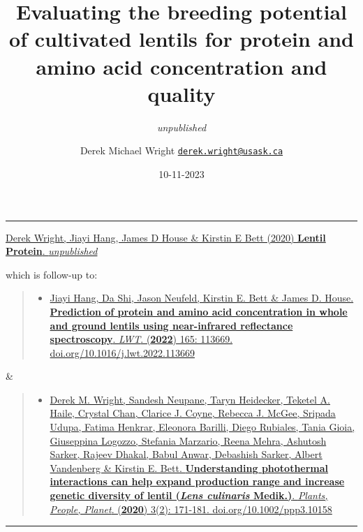 \documentclass[
]{article}
\title{Evaluating the breeding potential of cultivated lentils for
protein and amino acid concentration and quality}
\subtitle{\emph{unpublished}}
\author{Derek Michael Wright
\href{mailto:derek.wright@usask.ca}{\nolinkurl{derek.wright@usask.ca}}}
\date{10-11-2023}
\providecommand{\tightlist}{%
  \setlength{\itemsep}{0pt}\setlength{\parskip}{0pt}}
\begin{document}
\maketitle

{
\setcounter{tocdepth}{2}
\tableofcontents
}
\pagebreak

\begin{center}\rule{0.5\linewidth}{0.5pt}\end{center}

\href{https://github.com/derekmichaelwright/AGILE_LDP_Protein}{Derek
Wright, Jiayi Hang, James D House \& Kirstin E Bett (2020)
\textbf{Lentil Protein}. \emph{unpublished}}

which is follow-up to:

\begin{quote}
\begin{itemize}
\tightlist
\item
  \href{https://doi.org/10.1016/j.lwt.2022.113669}{Jiayi Hang, Da Shi,
  Jason Neufeld, Kirstin E. Bett \& James D. House. \textbf{Prediction
  of protein and amino acid concentration in whole and ground lentils
  using near-infrared reflectance spectroscopy}. \emph{LWT}.
  (\textbf{2022}) 165: 113669. doi.org/10.1016/j.lwt.2022.113669}
\end{itemize}
\end{quote}

\&

\begin{quote}
\begin{itemize}
\tightlist
\item
  \href{https://doi.org/10.1002/ppp3.10158}{Derek M. Wright, Sandesh
  Neupane, Taryn Heidecker, Teketel A. Haile, Crystal Chan, Clarice J.
  Coyne, Rebecca J. McGee, Sripada Udupa, Fatima Henkrar, Eleonora
  Barilli, Diego Rubiales, Tania Gioia, Giuseppina Logozzo, Stefania
  Marzario, Reena Mehra, Ashutosh Sarker, Rajeev Dhakal, Babul Anwar,
  Debashish Sarker, Albert Vandenberg \& Kirstin E. Bett.
  \textbf{Understanding photothermal interactions can help expand
  production range and increase genetic diversity of lentil (\emph{Lens
  culinaris} Medik.)}. \emph{Plants, People, Planet}. (\textbf{2020})
  3(2): 171-181. doi.org/10.1002/ppp3.10158}
\end{itemize}
\end{quote}

\begin{center}\rule{0.5\linewidth}{0.5pt}\end{center}
\end{document}
